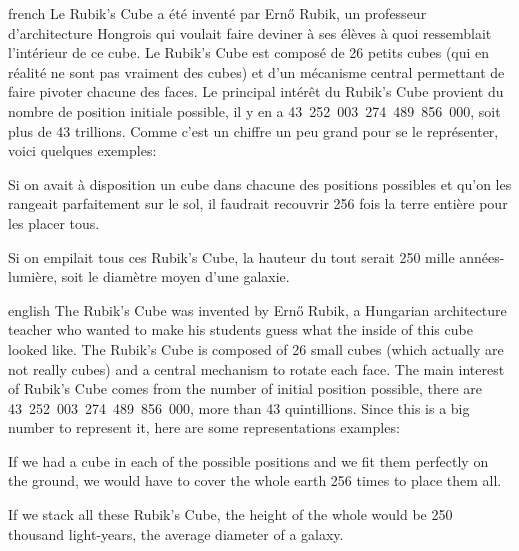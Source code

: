 \documentclass[0_Main.tex]{subfiles}
\begin{document}
\begin{shownto}{french}
Le Rubik’s Cube a été inventé par Ernő Rubik, un professeur d’architecture Hongrois qui voulait faire deviner à ses élèves à quoi ressemblait l’intérieur de ce cube.
Le Rubik’s Cube est composé de 26 petits cubes (qui en réalité ne sont pas vraiment des cubes) et d’un mécanisme central permettant de faire pivoter chacune des faces. Le principal intérêt du Rubik’s Cube provient du nombre de position initiale possible, il y en a 43~252~003~274~489~856~000, soit plus de 43 trillions. Comme c’est un chiffre un peu grand pour se le représenter, voici quelques exemples:

Si on avait à disposition un cube dans chacune des positions possibles et qu’on les rangeait parfaitement sur le sol, il faudrait recouvrir 256 fois la terre entière pour les placer tous.

Si on empilait tous ces Rubik’s Cube, la hauteur du tout serait 250 mille années-lumière, soit le diamètre moyen d’une galaxie.
\end{shownto}

\begin{shownto}{english}
The Rubik's Cube was invented by Ernő Rubik, a Hungarian architecture teacher who wanted to make his students guess what the inside of this cube looked like.
The Rubik's Cube is composed of 26 small cubes (which actually are not really cubes) and a central mechanism to rotate each face. The main interest of Rubik's Cube comes from the number of initial position possible, there are 43~252~003~274~489~856~000, more than 43 quintillions. Since this is a big number to represent it, here are some representations examples:

If we had a cube in each of the possible positions and we fit them perfectly on the ground, we would have to cover the whole earth 256 times to place them all.

If we stack all these Rubik's Cube, the height of the whole would be 250 thousand light-years, the average diameter of a galaxy.
\end{shownto}
\end{document}
